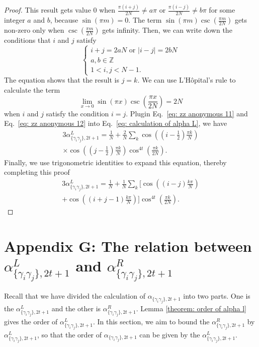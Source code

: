 \documentclass[journal=jctcce,a4paper,manuscript=article]{achemso}
\newcommand{\alpl}{\alpha_{\{\gamma_i\gamma_j\}, 2t+1}^{L}}
\newcommand{\alpr}{\alpha_{\{\gamma_i\gamma_j\}, 2t+1}^{R}}
\begin{document}
\begin{proof}
  This result gets value $0$ when $\frac{\pi(i+j)}{2 N}\neq a \pi$ or
  $\frac{\pi(i-j)}{2 N}\neq b \pi$ for some integer $a$ and $b$, because
  $\sin(\pi m) = 0$. The term $ \sin(\pi m) \csc(\frac{\pi m}{2N})$ gets non-zero
  only when $\csc(\frac{\pi m}{2N})$ gets infinity. Then, we can write down the
  conditions that $i$ and $j$ satisfy
  \begin{equation}
    \left\{\begin{array}{l}
      i+j=2 a N \text { or } |i-j|=2 b N \\
      a, b \in \mathbb{Z}                \\
      1<i,j<N-1.
    \end{array} \right.
  \end{equation}
  The equation shows that the result is $j=k$. We can use  L'Hôpital's rule to calculate the term
  \begin{equation}
    \label{eq: zz anonymous 11}
    \lim_{x\to 0} \sin(\pi x) \csc(\frac{\pi x}{2N}) = 2N
  \end{equation}
  when $i$ and $j$ satisfy the condition $i=j$. Plugin Eq.~\eqref{eq: zz anonymous 11} and Eq.~\eqref{eq: zz anonymous 12} into Eq.~\eqref{eq: calculation of alpha L}, we have
  \begin{equation}
    \label{eq: zz anonymous 13}
    \begin{aligned}
      3\alpl = \frac{1}{N} + \frac{2}{N} \sum_k \cos \left(\left(i-\frac{1}{2}\right) \frac{\pi k}{N}\right) \\
      \times \cos \left(\left(j-\frac{1}{2}\right) \frac{\pi k}{N}\right)\cos ^{4 t}\left( \frac{\pi k}{2 N} \right).
    \end{aligned}
  \end{equation}
  Finally, we use trigonometric identities to expand this equation, thereby completing this proof
  \begin{equation}
    \begin{aligned}
      3\alpl=\frac{1}{N}+\frac{1}{N} \sum_k\Big[\cos \left((i-j) \frac{k \pi}{N}\right) \\
        +\cos \left((i+j-1) \frac{k \pi}{N}\right)\Big] \cos ^{4 t}\left(\frac{\pi k}{2 N}\right).
    \end{aligned}
  \end{equation}
\end{proof}

\section{Appendix G: The relation between $\alpl$ and $\alpr$}
\label{appendix relation between alphaL and alpha}
Recall that we have divided the calculation of $\alpha_{\{\gamma_i\gamma_j\}, 2t+1}$ into two parts. One is the $\alpl$ and the other is $\alpr$. Lemma \ref{theorem: order of alpha l} gives the order of $\alpl$. In this section, we aim to bound the $\alpr$ by $\alpl$, so that the order of $\alpha_{\{\gamma_i\gamma_j\}, 2t+1}$ can be given by the $\alpl$.
\end{document}
